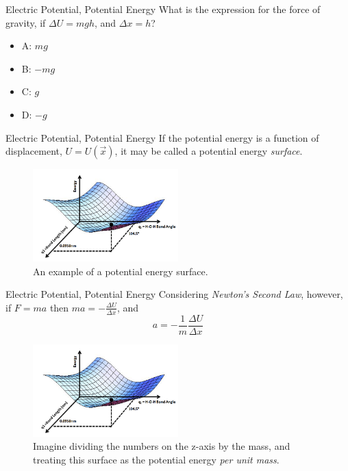 \documentclass{beamer}
\begin{document}
\begin{frame}{Electric Potential, Potential Energy}
What is the expression for the force of gravity, if $\Delta U = mgh$, and $\Delta x = h$?
\begin{itemize}
\item A: $mg$
\item B: $-mg$
\item C: $g$
\item D: $-g$
\end{itemize}
\end{frame}

\begin{frame}{Electric Potential, Potential Energy}
\small
If the potential energy is a function of displacement, $U = U(\vec{x})$, it may be called a potential energy \textit{surface}.
\begin{figure}
\centering
\includegraphics[width=0.5\textwidth]{figures/potential.png}
\caption{\label{fig:potential} An example of a potential energy surface.}
\end{figure}
\end{frame}

\begin{frame}{Electric Potential, Potential Energy}
\small
Considering \textit{Newton's Second Law}, however, if $F = m a$ then $m a = -\frac{\Delta U}{\Delta x}$, and
\begin{equation}
a = -\frac{1}{m}\frac{\Delta U}{\Delta x}
\end{equation}
\begin{figure}
\centering
\includegraphics[width=0.5\textwidth]{figures/potential.png}
\caption{\label{fig:potential2} \small Imagine dividing the numbers on the z-axis by the mass, and treating this surface as the potential energy \textit{per unit mass}.}
\end{figure}
\end{frame}
\end{document}
